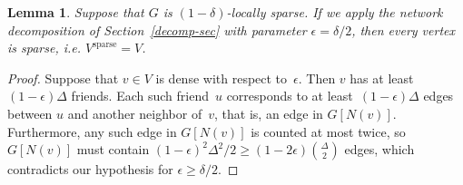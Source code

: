 \documentclass[11pt]{amsart}
\newtheorem{lemma}[theorem]{Lemma}
\begin{document}
\iffalse
\begin{lemma}
Suppose that we have a network decomposition with sparsity parameter~$\epsilon$. The neighborhood of a sparse vertex~$u$ spans at most $(1-\epsilon^2)\Delta^2/2$ edges. That is, $|\{xy \in E \mid x,y \in N(u) \}| \leq (1-\epsilon^2)\Delta^2/2$.
 \end{lemma}
\begin{proof}
We can count the number of edges in the neighborhood of $u$ by:
\begin{align*}
|\{xy \mid x,y \in N(u) \}| &= \frac{1}{2} \sum_{x \in N(u)}  |N(u) \cap N(x)| \qquad \text{(double counting)} \\
&= \frac{1}{2} \sum_{\substack{x \in N(u)\\ ux \in F}}  |N(u) \cap N(x)| + \frac{1}{2} \sum_{\substack{x \in N(u)\\ ux \notin F}}  |N(u) \cap N(x)| \\
&\leq \frac{1}{2} \sum_{\substack{x \in N(u)\\ ux \in F}}  \Delta + \frac{1}{2} \sum_{\substack{x \in N(u)\\ ux \notin F}}  (1 - \epsilon) \Delta \\
&= \frac{1}{2} \sum_{\substack{x \in N(u)\\ ux \in F}} \epsilon \Delta + \frac{1}{2} \sum_{x \in N(u)}  (1 - \epsilon) \Delta \\
&\leq \frac{1}{2} (1 - \epsilon) \Delta \epsilon \Delta + \frac{1}{2} \Delta  (1 - \epsilon) \Delta \qquad \text{($u$ has at most $(1-\epsilon) \Delta$ friends)} \\
&= \Delta^2 (1 - \epsilon^2) / 2
\end{align*}
\end{proof}
\fi

\begin{lemma}\label{sparse-equiv-prop}
Suppose that $G$ is $(1-\delta)$-locally sparse. If we apply the network decomposition of Section~\ref{decomp-sec} with parameter $\epsilon = \delta/2$, then every vertex is sparse, i.e. $V^{\text{sparse}} = V$.
\end{lemma}
\begin{proof}
Suppose that $v \in V$ is dense with respect to~$\epsilon$. Then $v$ has at least~$(1 - \epsilon) \Delta$ friends. Each such friend~$u$ corresponds to at least~$(1-\epsilon) \Delta$ edges between $u$ and another neighbor of~$v$, that is, an edge in $G[ N(v) ]$. Furthermore, any such edge in $G[ N(v) ]$ is counted at most twice, so $G[ N(v) ]$ must contain $(1-\epsilon)^2 \Delta^2/2 \geq (1 - 2 \epsilon) \binom{\Delta}{2}$ edges, which contradicts our hypothesis for $\epsilon \geq \delta/2$.
\end{proof}
\end{document}

